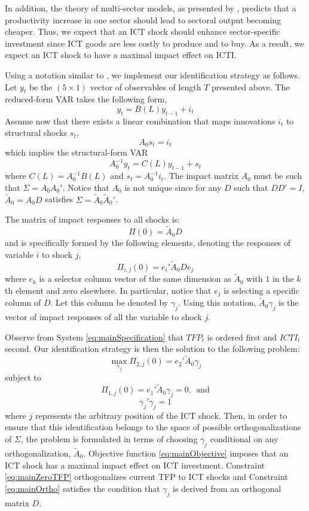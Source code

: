 \documentclass[12pt]{article}
\begin{document}
In addition, the theory of multi-sector models, as presented by \cite{greenwood1997long}, predicts that a productivity increase in one sector should lead to sectoral output becoming cheaper. Thus, we expect that an ICT shock should enhance sector-specific investment since ICT goods are less costly to produce and to buy. As a result, we expect an ICT shock to have a maximal impact effect on ICTI. 

Using a notation similar to \cite{barsky2011news}, we implement our identification strategy as follows. Let $y_t$ be the $(5 \times 1)$ vector of observables of length $T$ presented above. The reduced-form VAR takes the following form,
$$
y_t = B(L)y_{t-1} + i_t 
$$
Assume now that there exists a linear combination that maps innovations $i_t$ to structural shocks $s_t$,
$$
A_0 s_t = i_t
$$
which implies the structural-form VAR
$$
A_0^{-1}y_t = C(L) y_{t-1} + s_t
$$
where $C(L) = A_0^{-1} B(L)$ and $s_t = A_0^{-1} i_t$. The impact matrix $A_0$ must be such that $\Sigma = A_0 A_0'$. Notice that $A_0$ is not unique since for any $D$ such that $DD' = I$, $\tilde{A}_0 = A_0 D$ satisfies $\Sigma = \tilde{A}_0 \tilde{A}_0'$. 

The matrix of impact responses to all shocks is: %
$$
\Pi(0) = \tilde{A}_0 D
$$
and is specifically formed by the following elements, denoting the responses of variable $i$ to shock $j$, %
$$
\Pi_{i,j}(0) = e_i' \tilde{A}_0 D e_j
$$
where $e_k$ is a selector column vector of the same dimension as $\tilde{A}_0$ with $1$ in the $k$th element and zero elsewhere. In particular, notice that $e_j$ is selecting a specific column of $D$. Let this column be denoted by $\gamma_j$. Using this notation, $\tilde{A}_0\gamma_j$ is the vector of impact responses of all the variable to shock $j$.

Observe from System \ref{eq:mainSpecification} that $TFP_t$ is ordered first and $ICTI_t$ second. Our identification strategy is then the solution to the following problem:
\begin{equation}\label{eq:mainObjective}
\max_{\gamma_j} \Pi_{2,j}(0) = e_2' \tilde{A}_0 \gamma_j
\end{equation}
subject to
\begin{equation}\label{eq:mainZeroTFP}
\Pi_{1,j}(0) = e_1' \tilde{A}_0 \gamma_j = 0, \ \ \text{and}
\end{equation}
\begin{equation}\label{eq:mainOrtho}
\gamma_j' \gamma_j = 1
\end{equation}
where $j$ represents the arbitrary position of the ICT shock. Then, in order to ensure that this identification belongs to the space of possible orthogonalizations of $\Sigma$, the problem is formulated in terms of choosing $\gamma_j$ conditional on any orthogonalization, $\tilde{A}_0$. Objective function \ref{eq:mainObjective} imposes that an ICT shock has a maximal impact effect on ICT investment. Constraint \ref{eq:mainZeroTFP} orthogonalizes current TFP to ICT shocks and Constraint \ref{eq:mainOrtho} satisfies the condition that $\gamma_j$ is derived from an orthogonal matrix $D$.  
\end{document}
